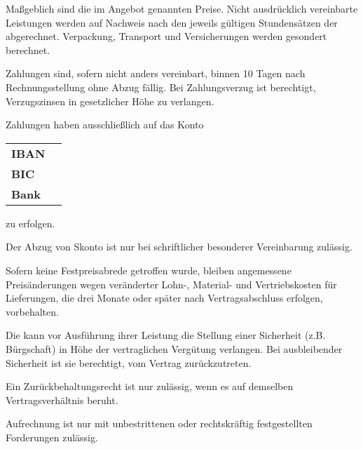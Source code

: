 \documentclass[fontsize=12pt,parskip=half]{scrartcl}
\begin{document}
\begin{contract}

\Clause[title={Preise}]

Maßgeblich sind die im Angebot genannten Preise. Nicht ausdrücklich vereinbarte Leistungen werden auf Nachweis nach den jeweils gültigen Stundensätzen der \companyName{} abgerechnet. Verpackung, Transport und Versicherungen werden gesondert berechnet.

\Clause[title={Zahlungsbedingungen}]

Zahlungen sind, sofern nicht anders vereinbart, binnen 10 Tagen nach Rechnungsstellung ohne Abzug fällig. Bei Zahlungsverzug ist \companyName{} berechtigt, Verzugszinsen in gesetzlicher Höhe zu verlangen.

Zahlungen haben ausschließlich auf das Konto \newline
\begin{minipage}[t]{\dimexpr\linewidth-2em}
  \vspace{0.1em}\hspace{2em}
\begin{tabular}{ll}
  \textbf{IBAN} & \accountIBAN{} \\
  \textbf{BIC} & \accountBIC{} \\
  \textbf{Bank} & \accountBank{} \\
\end{tabular}\vspace{0.5em}
\end{minipage}\newline
zu erfolgen. 

Der Abzug von Skonto ist nur bei schriftlicher besonderer Vereinbarung zulässig.

Sofern keine Festpreisabrede getroffen wurde, bleiben angemessene Preisänderungen wegen veränderter Lohn-, Material- und Vertriebskosten für Lieferungen, die drei Monate oder später nach Vertragsabschluss erfolgen, vorbehalten.

\Clause[title={Sicherheiten}]

Die \companyName{} kann vor Ausführung ihrer Leistung die Stellung einer Sicherheit (z.B. Bürgschaft) in Höhe der vertraglichen Vergütung verlangen. Bei ausbleibender Sicherheit ist sie berechtigt, vom Vertrag zurückzutreten.

\Clause[title={Aufrechnung und Zurückbehaltung}]

Ein Zurückbehaltungsrecht ist nur zulässig, wenn es auf demselben Vertragsverhältnis beruht. 

Aufrechnung ist nur mit unbestrittenen oder rechtskräftig festgestellten Forderungen zulässig.

\end{contract}
\end{document}
